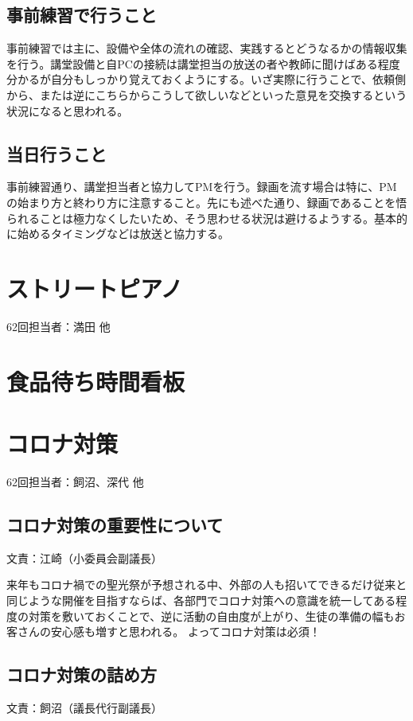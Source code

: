 \documentclass[dvipdfmx,jb5]{jarticle}
\begin{document}
\subsection{事前練習で行うこと}
事前練習では主に、設備や全体の流れの確認、実践するとどうなるかの情報収集を行う。講堂設備と自PCの接続は講堂担当の放送の者や教師に聞けばある程度分かるが自分もしっかり覚えておくようにする。いざ実際に行うことで、依頼側から、または逆にこちらからこうして欲しいなどといった意見を交換するという状況になると思われる。

\subsection{当日行うこと}
事前練習通り、講堂担当者と協力してPMを行う。録画を流す場合は特に、PMの始まり方と終わり方に注意すること。先にも述べた通り、録画であることを悟られることは極力なくしたいため、そう思わせる状況は避けるようする。基本的に始めるタイミングなどは放送と協力する。




 \section{ストリートピアノ}
62回担当者：満田 他

\section{食品待ち時間看板}\label{sec:食品待ち時間看板}

 \section{コロナ対策}
62回担当者：飼沼、深代 他

\subsection{コロナ対策の重要性について} 文責：江崎（小委員会副議長） \vspace{2mm}

来年もコロナ禍での聖光祭が予想される中、外部の人も招いてできるだけ従来と同じような開催を目指すならば、各部門でコロナ対策への意識を統一してある程度の対策を敷いておくことで、逆に活動の自由度が上がり、生徒の準備の幅もお客さんの安心感も増すと思われる。
よってコロナ対策は必須！

\subsection{コロナ対策の詰め方} 文責：飼沼（議長代行副議長） \vspace{2mm}
\end{document}

